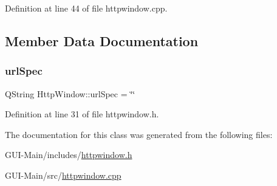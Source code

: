 Definition at line 44 of file httpwindow.\+cpp.



\subsection{Member Data Documentation}
\mbox{\label{classHttpWindow_aa6f089df1046cf5e824dee5ecd8d448a}} 
\subsubsection{\texorpdfstring{url\+Spec}{urlSpec}}
{\footnotesize\ttfamily Q\+String Http\+Window\+::url\+Spec = \char`\"{}\char`\"{}}



Definition at line 31 of file httpwindow.\+h.



The documentation for this class was generated from the following files\+:\begin{DoxyCompactItemize}
\item 
G\+U\+I-\/\+Main/includes/\hyperlink{httpwindow_8h}{httpwindow.\+h}\item 
G\+U\+I-\/\+Main/src/\hyperlink{httpwindow_8cpp}{httpwindow.\+cpp}\end{DoxyCompactItemize}

